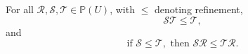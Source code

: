 For all $\mathcal{R}, \mathcal{S}, \mathcal{T} \in \mathbb{P}(U)$, with $\leq$ denoting refinement,
$$\mathcal{S}\mathcal{T} \leq \mathcal{T},$$
and
$$\text{if } \mathcal{S} \leq \mathcal{T}, \text{ then } \mathcal{S}\mathcal{R} \leq \mathcal{T}\mathcal{R}.$$
